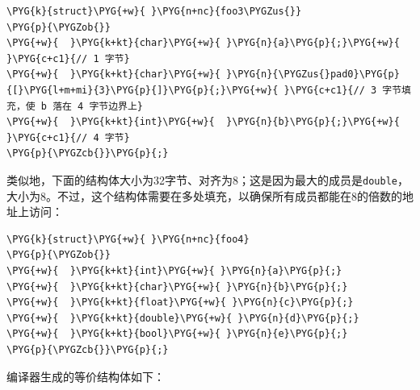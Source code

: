 
\begin{codeblockbg}
\begin{Verbatim}[commandchars=\\\{\},breaklines=true,breakanywhere=true,fontsize=\codefont,xleftmargin=17bp]
\PYG{k}{struct}\PYG{+w}{ }\PYG{n+nc}{foo3\PYGZus{}}
\PYG{p}{\PYGZob{}}
\PYG{+w}{  }\PYG{k+kt}{char}\PYG{+w}{ }\PYG{n}{a}\PYG{p}{;}\PYG{+w}{        }\PYG{c+c1}{// 1 字节}
\PYG{+w}{  }\PYG{k+kt}{char}\PYG{+w}{ }\PYG{n}{\PYGZus{}pad0}\PYG{p}{[}\PYG{l+m+mi}{3}\PYG{p}{]}\PYG{p}{;}\PYG{+w}{ }\PYG{c+c1}{// 3 字节填充，使 b 落在 4 字节边界上}
\PYG{+w}{  }\PYG{k+kt}{int}\PYG{+w}{  }\PYG{n}{b}\PYG{p}{;}\PYG{+w}{        }\PYG{c+c1}{// 4 字节}
\PYG{p}{\PYGZcb{}}\PYG{p}{;}
\end{Verbatim}
\end{codeblockbg}



类似地，下面的结构体大小为32字节、对齐为8；这是因为最大的成员是\texttt{double}，大小为8。不过，这个结构体需要在多处填充，以确保所有成员都能在8的倍数的地址上访问：



\begin{codeblockbg}
\begin{Verbatim}[commandchars=\\\{\},breaklines=true,breakanywhere=true,fontsize=\codefont,xleftmargin=17bp]
\PYG{k}{struct}\PYG{+w}{ }\PYG{n+nc}{foo4}
\PYG{p}{\PYGZob{}}
\PYG{+w}{  }\PYG{k+kt}{int}\PYG{+w}{ }\PYG{n}{a}\PYG{p}{;}
\PYG{+w}{  }\PYG{k+kt}{char}\PYG{+w}{ }\PYG{n}{b}\PYG{p}{;}
\PYG{+w}{  }\PYG{k+kt}{float}\PYG{+w}{ }\PYG{n}{c}\PYG{p}{;}
\PYG{+w}{  }\PYG{k+kt}{double}\PYG{+w}{ }\PYG{n}{d}\PYG{p}{;}
\PYG{+w}{  }\PYG{k+kt}{bool}\PYG{+w}{ }\PYG{n}{e}\PYG{p}{;}
\PYG{p}{\PYGZcb{}}\PYG{p}{;}
\end{Verbatim}
\end{codeblockbg}



编译器生成的等价结构体如下：



